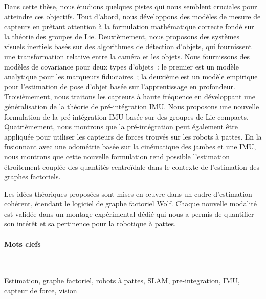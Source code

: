 Dans cette thèse, nous étudions quelques pistes qui nous semblent cruciales pour atteindre ces objectifs. Tout d'abord, nous développons des modèles de mesure de 
capteurs en prêtant attention à la formulation mathématique correcte fondé sur la théorie des groupes de Lie.
Deuxièmement, nous proposons des systèmes visuels inertiels basés sur des algorithmes de détection d'objets, qui fournissent une transformation relative entre la caméra 
et les objets.
Nous fournissons des modèles de covariance pour deux types d'objets : le premier est un modèle analytique pour les marqueurs fiduciaires ; la deuxième
est un modèle empirique pour l'estimation de pose d'objet basée sur l'apprentissage en profondeur.
Troisièmement, nous traitons les capteurs à haute fréquence en développant une généralisation de la théorie de pré-intégration IMU. Nous proposons une nouvelle 
formulation de la pré-intégration IMU basée sur des groupes de Lie compacts.
Quatrièmement, nous montrons que la pré-intégration peut également être appliquée pour utiliser les capteurs de forces trouvés sur les robots à pattes.
En la fusionnant avec une odométrie basée sur la cinématique des jambes et une IMU, nous montrons que cette nouvelle formulation rend possible l'estimation 
étroitement couplée des quantités centroïdale dans le contexte de l'estimation des graphes factoriels.

Les idées théoriques proposées sont mises en œuvre dans un cadre d'estimation cohérent, étendant le logiciel de graphe factoriel Wolf. 
Chaque nouvelle modalité est validée dans un montage expérimental dédié qui nous a permis de quantifier son intérêt et sa pertinence pour la robotique à pattes.


\paragraph{Mots clefs} ~

Estimation, graphe factoriel, robots à pattes, SLAM, pre-integration, IMU, capteur de force, vision 


\noindent\makebox[\linewidth]{\rule{0.6\textwidth}{2pt}}

\normalsize